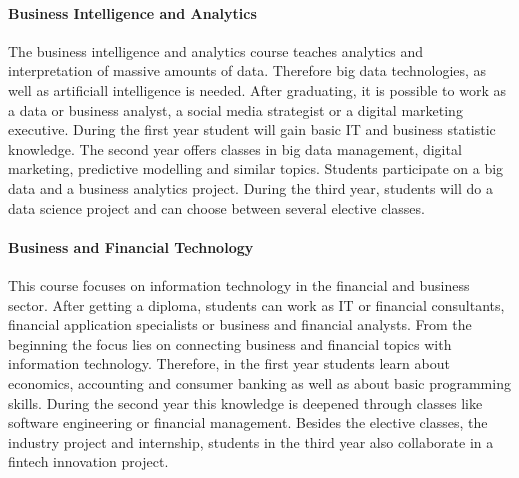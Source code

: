 \paragraph{Business Intelligence and Analytics}
The business intelligence and analytics course teaches analytics and interpretation of massive amounts of data. Therefore big data technologies, as well as artificiall intelligence is needed. After graduating, it is possible to work as a data or business analyst, a social media strategist or a digital marketing executive. During the first year student will gain basic IT and business statistic knowledge. The second year offers classes in big data management, digital marketing, predictive modelling and similar topics. Students participate on a big data and a business analytics project.
During the third year, students will do a data science project and can choose between several elective classes.

\paragraph{Business and Financial Technology}
This course focuses on information technology in the financial and business sector. After getting a diploma, students can work as IT or financial consultants, financial application specialists or business and financial analysts. From the beginning the focus lies on connecting business and financial topics with information technology. Therefore, in the first year students learn about economics, accounting and consumer banking as well as about basic programming skills. During the second year this knowledge is deepened through classes like software engineering or financial management. Besides the elective classes, the industry project and internship, students in the third year also collaborate in a fintech innovation project.


